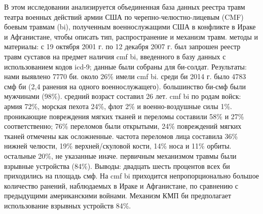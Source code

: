В этом исследовании анализируется объединенная база данных реестра травм театра
военных действий армии США по черепно-челюстно-лицевым (CMF) боевым травмам
(bi), полученным военнослужащими США в конфликте в Ираке и Афганистане, чтобы
описать тип, распространение и механизм травм. методы и материалы: с 19 октября
2001 г. по 12 декабря 2007 г. был запрошен реестр травм суставов на предмет
наличия cmf bi, введенного в базу данных с использованием кодов icd-9; данные
были собраны для би-солдат. Результаты: нами выявлено 7770 би. около 26\% имели
cmf bi. среди би 2014 г. было 4783 смф би (2,4 ранения на одного
военнослужащего). большинство би-смф были мужчинами (98\%). средний возраст
составил 26 лет. cmf bi по родам войск: армия 72\%, морская пехота 24\%, флот
2\% и военно-воздушные силы 1\%. проникающие повреждения мягких тканей и
переломы составили 58\% и 27\% соответственно; 76\% переломов были открытыми,
24\% повреждений мягких тканей отмечены как осложненные. частота переломов лица
составила 36\% нижней челюсти, 19\% верхней/скуловой кости, 14\% носа и 11\%
орбиты. остальные 20\%, не указанные иначе. первичным механизмом травмы были
взрывные устройства (84\%). Выводы: двадцать шесть процентов всех би приходились
на площадь смф. На cmf bi приходится непропорционально большое количество
ранений, наблюдаемых в Ираке и Афганистане, по сравнению с предыдущими
американскими войнами. Механизм КМП би предполагает использование взрывных
устройств 84\%.\cite{23739250}

